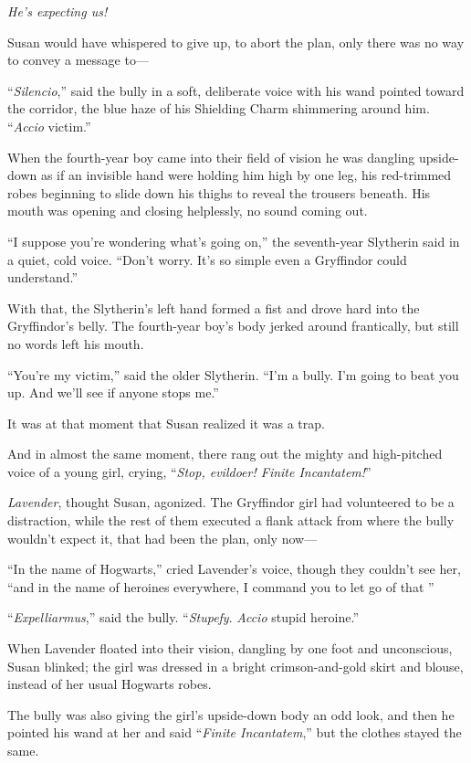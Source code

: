 \emph{He’s expecting us!}

Susan would have whispered to give up, to abort the plan, only there was no way to convey a message to—

“\emph{Silencio},” said the bully in a soft, deliberate voice with his wand pointed toward the corridor, the blue haze of his Shielding Charm shimmering around him. “\emph{Accio} victim.”

When the fourth-year boy came into their field of vision he was dangling upside-down as if an invisible hand were holding him high by one leg, his red-trimmed robes beginning to slide down his thighs to reveal the trousers beneath. His mouth was opening and closing helplessly, no sound coming out.

“I suppose you’re wondering what’s going on,” the seventh-year Slytherin said in a quiet, cold voice. “Don’t worry. It’s so simple even a Gryffindor could understand.”

With that, the Slytherin’s left hand formed a fist and drove hard into the Gryffindor’s belly. The fourth-year boy’s body jerked around frantically, but still no words left his mouth.

“You’re my victim,” said the older Slytherin. “I’m a bully. I’m going to beat you up. And we’ll see if anyone stops me.”

It was at that moment that Susan realized it was a trap.

And in almost the same moment, there rang out the mighty and high-pitched voice of a young girl, crying, “\emph{Stop, evildoer! Finite Incantatem!}”

\emph{Lavender}, thought Susan, agonized. The Gryffindor girl had volunteered to be a distraction, while the rest of them executed a flank attack from where the bully wouldn’t expect it, that had been the plan, only now—

“In the name of Hogwarts,” cried Lavender’s voice, though they couldn’t see her, “and in the name of heroines everywhere, I command you to let go of that ”

“\emph{Expelliarmus},” said the bully. “\emph{Stupefy}. \emph{Accio} stupid heroine.”

When Lavender floated into their vision, dangling by one foot and unconscious, Susan blinked; the girl was dressed in a bright crimson-and-gold skirt and blouse, instead of her usual Hogwarts robes.

The bully was also giving the girl’s upside-down body an odd look, and then he pointed his wand at her and said “\emph{Finite Incantatem},” but the clothes stayed the same.

